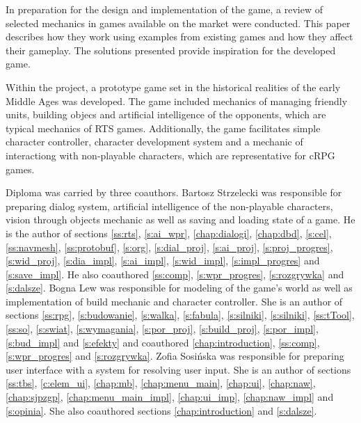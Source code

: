 In preparation for the design and implementation of the game, a review of selected mechanics in games available
on the market were conducted. This paper describes how they work using examples from existing games and how
they affect their gameplay. The solutions presented provide inspiration for the developed game.

Within the project, a prototype game set in the historical realities of the early Middle Ages was developed. The game
included mechanics of managing friendly units, building objecs and artificial intelligence of the opponents, which are
typical mechanics of RTS games. Additionally, the game facilitates simple character controller, character development
system and a mechanic of interactiong with non-playable characters, which are representative for cRPG games.

Diploma was carried by three coauthors. Bartosz Strzelecki was responsible for preparing dialog system, artificial
intelligence of the non-playable characters, vision through objects mechanic as well as saving and loading state of a game.
He is the author of sections \ref{ss:rts},
\ref{s:ai_wpr}, \ref{chap:dialogi}, \ref{chap:dbd}, \ref{s:cel}, \ref{ss:navmesh}, \ref{ss:protobuf}, \ref{s:org},
\ref{s:dial_proj}, \ref{s:ai_proj}, \ref{s:proj_progres}, \ref{s:wid_proj}, \ref{s:dia_impl}, \ref{s:ai_impl}, \ref{s:wid_impl}, \ref{s:impl_progres} and
\ref{s:save_impl}. He also coauthored \ref{ss:comp}, \ref{s:wpr_progres}, \ref{s:rozgrywka} and \ref{s:dalsze}. Bogna Lew
was responsible for modeling of the game's world as well as implementation of build mechanic and character controller. She
is an author of sections \ref{ss:rpg}, \ref{s:budowanie}, \ref{s:walka}, \ref{s:fabula}, \ref{s:silniki}, \ref{s:silniki},
\ref{ss:tTool}, \ref{ss:so}, \ref{s:swiat}, \ref{s:wymagania}, \ref{s:por_proj}, \ref{s:build_proj}, \ref{s:por_impl}, \ref{s:bud_impl} and
\ref{s:efekty} and coauthored \ref{chap:introduction}, \ref{ss:comp}, \ref{s:wpr_progres} and \ref{s:rozgrywka}.
Zofia Sosińska was responsible for preparing user interface with a system for resolving user input. She is an author of
sections \ref{ss:tbs}, \ref{c:elem_ui}, \ref{chap:mb},
\ref{chap:menu_main}, \ref{chap:ui}, \ref{chap:naw}, \ref{chap:sjpzgp}, \ref{chap:menu_main_impl}, \ref{chap:ui_imp},
\ref{chap:naw_impl} and  \ref{s:opinia}. She also coauthored sections \ref{chap:introduction} and \ref{s:dalsze}.